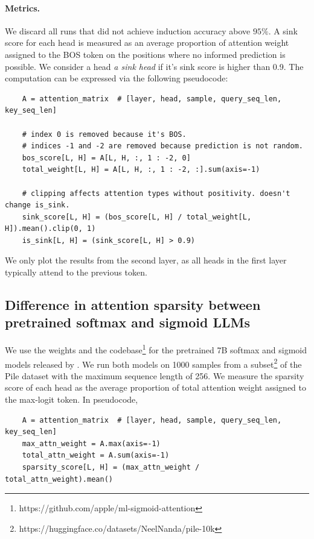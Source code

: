 \documentclass{article}
\theoremstyle{plain}
\theoremstyle{definition}
\theoremstyle{remark}
\begin{document}
\paragraph{Metrics.}

We discard all runs that did not achieve induction accuracy above $95\%$. A sink score for each head is measured as an average proportion of attention weight assigned to the BOS token on the positions where no informed prediction is possible. We consider a head \emph{a sink head} if it's sink score is higher than 0.9.
The computation can be expressed via the following pseudocode:
{\small \begin{verbatim}
    A = attention_matrix  # [layer, head, sample, query_seq_len, key_seq_len]

    # index 0 is removed because it's BOS. 
    # indices -1 and -2 are removed because prediction is not random.
    bos_score[L, H] = A[L, H, :, 1 : -2, 0]
    total_weight[L, H] = A[L, H, :, 1 : -2, :].sum(axis=-1)

    # clipping affects attention types without positivity. doesn't change is_sink.
    sink_score[L, H] = (bos_score[L, H] / total_weight[L, H]).mean().clip(0, 1) 
    is_sink[L, H] = (sink_score[L, H] > 0.9)
\end{verbatim}}

We only plot the results from the second layer, as all heads in the first layer typically attend to the previous token.

\subsection{Difference in attention sparsity between pretrained softmax and sigmoid LLMs}

We use the weights and the codebase\footnote{https://github.com/apple/ml-sigmoid-attention} for the pretrained 7B softmax and sigmoid models released by \citet{ramapuramtheory}. We run both models on 1000 samples from a subset\footnote{https://huggingface.co/datasets/NeelNanda/pile-10k} of the Pile dataset \citep{gao2020pile} with the maximum sequence length of 256. We measure the sparsity score of each head as the average proportion of total attention weight assigned to the max-logit token. In pseudocode,
{\small \begin{verbatim}
    A = attention_matrix  # [layer, head, sample, query_seq_len, key_seq_len]
    max_attn_weight = A.max(axis=-1)
    total_attn_weight = A.sum(axis=-1)
    sparsity_score[L, H] = (max_attn_weight / total_attn_weight).mean()
\end{verbatim}}
\end{document}
